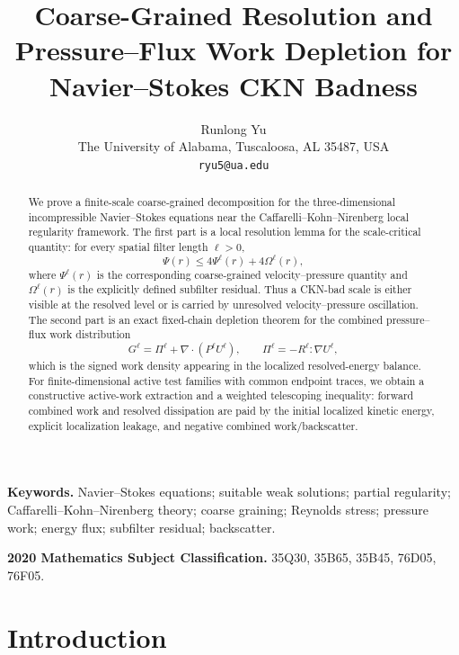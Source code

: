\documentclass[11pt]{article}
\title{\textbf{Coarse-Grained Resolution and Pressure--Flux Work Depletion for Navier--Stokes CKN Badness}}
\author{Runlong Yu\\
The University of Alabama,
Tuscaloosa, AL 35487, USA\\
\texttt{ryu5@ua.edu}}
\date{}
\numberwithin{equation}{section}
\begin{document}
\maketitle


\begin{abstract}
We prove a finite-scale coarse-grained decomposition for the three-dimensional incompressible Navier--Stokes equations near the Caffarelli--Kohn--Nirenberg local regularity framework.  The first part is a local resolution lemma for the scale-critical quantity: for every spatial filter length \(\ell>0\),
\[
\Psi(r)\le 4\Psi^\ell(r)+4\Omega^\ell(r),
\]
where \(\Psi^\ell(r)\) is the corresponding coarse-grained velocity--pressure quantity and \(\Omega^\ell(r)\) is the explicitly defined subfilter residual.  Thus a CKN-bad scale is either visible at the resolved level or is carried by unresolved velocity--pressure oscillation.  The second part is an exact fixed-chain depletion theorem for the combined pressure--flux work distribution
\[
G^\ell=\Pi^\ell+\nabla\cdot(P^\ell U^\ell),
\qquad
\Pi^\ell=-R^\ell:\nabla U^\ell,
\]
which is the signed work density appearing in the localized resolved-energy balance.  For finite-dimensional active test families with common endpoint traces, we obtain a constructive active-work extraction and a weighted telescoping inequality: forward combined work and resolved dissipation are paid by the initial localized kinetic energy, explicit localization leakage, and negative combined work/backscatter.  
\end{abstract}


\medskip
\noindent\textbf{Keywords.}
Navier--Stokes equations; suitable weak solutions; partial regularity; Caffarelli--Kohn--Nirenberg theory; coarse graining; Reynolds stress; pressure work; energy flux; subfilter residual; backscatter.

\medskip
\noindent\textbf{2020 Mathematics Subject Classification.}
35Q30, 35B65, 35B45, 76D05, 76F05.

\tableofcontents


\section{Introduction}\label{sec:introduction}
\end{document}
